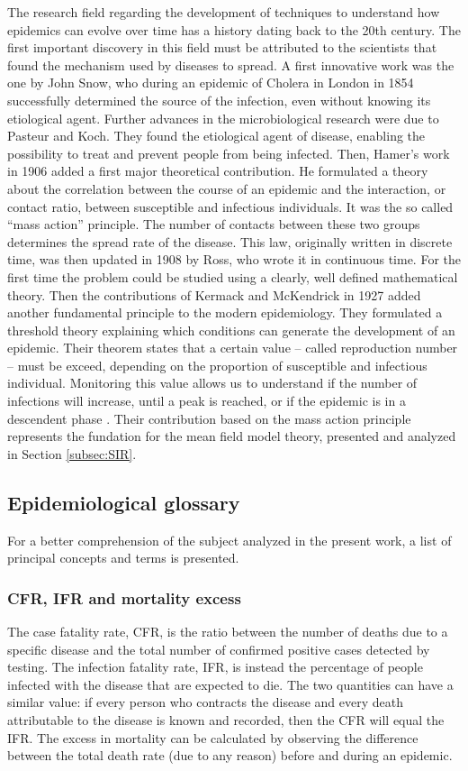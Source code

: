 The research field regarding the development of techniques to understand how epidemics can evolve over time has a history dating back to the 20th century. The first important discovery in this field must be attributed to the scientists that found the mechanism used by diseases to spread. 
A first innovative work was the one by John Snow, who during an epidemic of Cholera in London in 1854 successfully determined the source of the infection, even without knowing its etiological agent. Further advances in the microbiological research were due to Pasteur and Koch. They found the etiological agent of disease, enabling the possibility to treat and prevent people from being infected. Then, Hamer's work in 1906 added a first major theoretical contribution. He formulated a theory about the correlation between the course of an epidemic and the interaction, or contact ratio, between susceptible and infectious individuals. It was the so called “mass action” principle. The number of contacts between these two groups determines the spread rate of the disease. 
This law, originally written in discrete time, was then updated in 1908 by Ross, who wrote it  in continuous time. For the first time the problem could be studied using a clearly, well defined mathematical theory. Then the contributions of Kermack and McKendrick in 1927 added another fundamental principle to the modern epidemiology. They formulated a threshold theory explaining which conditions can generate the development of an epidemic. Their theorem states that a certain value -- called reproduction number -- must be exceed, depending on the proportion of susceptible and infectious individual. Monitoring this value allows us to understand if the number of infections will increase, until a peak is reached, or if the epidemic is in a descendent phase \cite{Mata2021, Anderson_82}. 
Their contribution based on the mass action principle represents the fundation for the mean field model theory, presented and analyzed in Section \ref{subsec:SIR}. 


\subsection{Epidemiological glossary}
\label{subsec:glossary}
For a better comprehension of the subject analyzed in the present work, a list of principal concepts and terms is presented. 

\subsubsection{CFR, IFR and mortality excess} The case fatality rate, CFR, is the ratio between the number of deaths due to a specific disease and the total number of confirmed positive cases detected by testing. 
The infection fatality rate, IFR, is instead the percentage of people infected with the disease that are expected to die. The two quantities can have a similar value: if every person who contracts the disease and every death attributable to the disease is known and recorded, then the CFR will equal the IFR.
The excess in mortality can be calculated by observing the difference between the total death rate (due to any reason) before and during an epidemic. 


